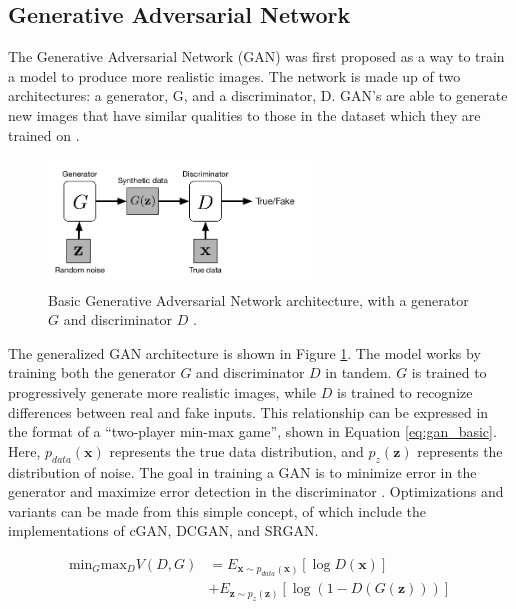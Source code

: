 \documentclass[letterpaper]{article} %
\begin{document}
\subsection{Generative Adversarial Network}
The Generative Adversarial Network (GAN)
was first proposed as a way to train a model to produce more realistic images.
The network is made up of two architectures:
a generator, G, and a discriminator, D.
GAN's are able to generate new images that have similar qualities to
those in the dataset which they are trained on
\cite{generative_adversarial_networks}.

\begin{figure}[htbp]
\centerline{\includegraphics[width=7cm]{gan_architecture.png}}
\caption{Basic Generative Adversarial Network architecture, with a generator $G$
and discriminator $D$
\cite{cgan}.}
\label{fig:gan_architecture}
\end{figure}

The generalized GAN architecture is shown in Figure \ref{fig:gan_architecture}.
The model works by training both the generator $G$ and
discriminator $D$ in tandem.
$G$ is trained to progressively generate more realistic images,
while $D$ is trained to recognize differences between real and fake inputs.
This relationship can be expressed in the format of a
``two-player min-max game'', shown in Equation \ref{eq:gan_basic}.
Here, $p_{data}(\mathbf{x})$ represents the true data distribution,
and $p_{z}(\mathbf{z})$ represents the distribution of noise.
The goal in training a GAN is to minimize error in the generator
and maximize error detection in the discriminator \cite{cgan}.
Optimizations and variants can be made from this simple concept, of which include
the implementations of cGAN, DCGAN, and SRGAN.

\begin{equation}
\label{eq:gan_basic}
\begin{split}
\text{min}_G\text{max}_DV(D,G) &=
E_{\mathbf{x}\sim p_{data}(\mathbf{x})}[\log D(\mathbf{x})] \\
&+ E_{\mathbf{z}\sim p_{z}(\mathbf{z})}[\log(1 - D(G(\mathbf{z})))]
\end{split}
\end{equation}
\end{document}
